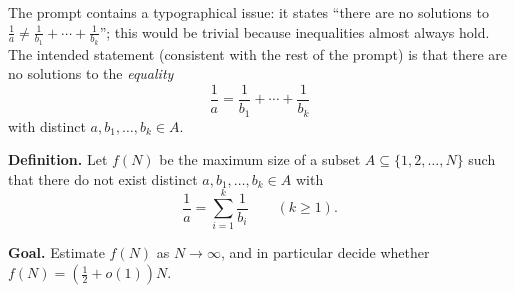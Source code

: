 The prompt contains a typographical issue: it states ``there are no solutions to $\frac1a\neq \frac1{b_1}+\cdots+\frac1{b_k}$''; this would be trivial because inequalities almost always hold. The intended statement (consistent with the rest of the prompt) is that there are no solutions to the \emph{equality}
\[
\frac1a=\frac1{b_1}+\cdots+\frac1{b_k}
\]
with distinct $a,b_1,\dots,b_k\in A$.

\medskip

\noindent\textbf{Definition.} Let $f(N)$ be the maximum size of a subset $A\subseteq\{1,2,\dots,N\}$ such that there do not exist distinct $a,b_1,\dots,b_k\in A$ with
\[
\frac1a=\sum_{i=1}^k \frac1{b_i}
\qquad (k\ge 1).
\]

\noindent\textbf{Goal.} Estimate $f(N)$ as $N\to\infty$, and in particular decide whether $f(N)=(\tfrac12+o(1))N$.
